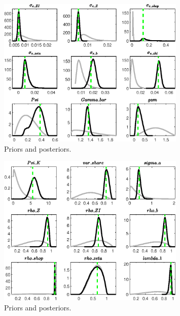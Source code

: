  
\begin{figure}[H]
\centering
\includegraphics[width=0.80\textwidth]{directed_search/Output/directed_search_PriorsAndPosteriors1}
\caption{Priors and posteriors.}\label{Fig:PriorsAndPosteriors:1}
\end{figure}
 
\begin{figure}[H]
\centering
\includegraphics[width=0.80\textwidth]{directed_search/Output/directed_search_PriorsAndPosteriors2}
\caption{Priors and posteriors.}\label{Fig:PriorsAndPosteriors:2}
\end{figure}
 
